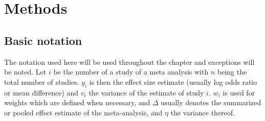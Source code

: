\documentclass[11pt,a4paper,twoside]{book}\usepackage[]{graphicx}\usepackage[]{color}
\begin{document}










\chapter{Methods}

\section{Basic notation}
The notation used here will be used throughout the chapter and exceptions will be noted. Let $i$ be the number of a study of a meta analysis with $n$ being the total number of studies. $y_{i}$ is then the effect size estimate (usually log odds ratio or mean difference) and $v_{i}$ the variance of the estimate of study $i$. $w_{i}$ is used for weights which are defined when necessary, and $\Delta$ usually denotes the summarized or pooled effect estimate of the meta-analysis, and $\eta$ the variance thereof.
\end{document}
